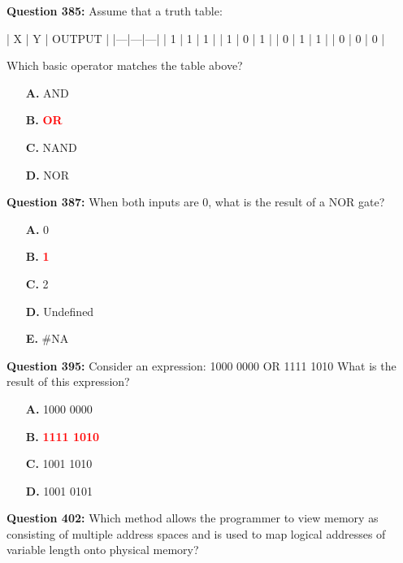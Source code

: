 \documentclass[12pt,a4paper]{article}
\begin{document}
\vspace{0.5cm}

\textbf{Question 385:} Assume that a truth table:

| X | Y | OUTPUT |
|---|---|---|
| 1 | 1 | 1 |
| 1 | 0 | 1 |
| 0 | 1 | 1 |
| 0 | 0 | 0 |

Which basic operator matches the table above?

\begin{itemize}
    \item[\textbf{A.}] AND
    \item[\textbf{B.}] \textcolor{red}{\textbf{OR}}
    \item[\textbf{C.}] NAND
    \item[\textbf{D.}] NOR
\end{itemize}

\vspace{0.5cm}

\textbf{Question 387:} When both inputs are 0, what is the result of a NOR gate?

\begin{itemize}
    \item[\textbf{A.}] 0
    \item[\textbf{B.}] \textcolor{red}{\textbf{1}}
    \item[\textbf{C.}] 2
    \item[\textbf{D.}] Undefined
    \item[\textbf{E.}] \#NA
\end{itemize}

\vspace{0.5cm}

\textbf{Question 395:} Consider an expression: 1000 0000 OR 1111 1010 What is the result of this expression?

\begin{itemize}
    \item[\textbf{A.}] 1000 0000
    \item[\textbf{B.}] \textcolor{red}{\textbf{1111 1010}}
    \item[\textbf{C.}] 1001 1010
    \item[\textbf{D.}] 1001 0101
\end{itemize}

\vspace{0.5cm}

\textbf{Question 402:} Which method allows the programmer to view memory as consisting of multiple address spaces and is used to map logical addresses of variable length onto physical memory?
\end{document}
